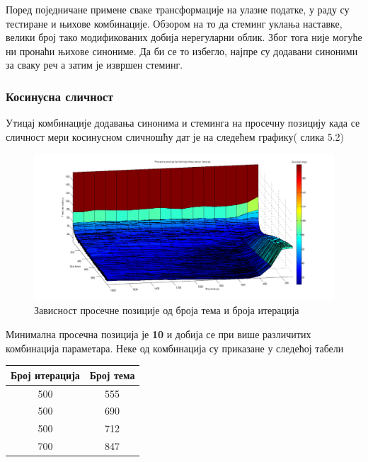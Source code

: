 Поред поједничане примене сваке трансформације на улазне податке, у раду су тестиране и њихове комбинације. Обзором на то да стеминг уклања наставке, велики број тако модификованих добија нерегуларни облик. Због тога није могуће ни пронаћи њихове синониме. Да би се то избегло, најпре су додавани синоними за сваку реч а затим је извршен стеминг.

\subsubsection{Косинусна сличност}



Утицај  комбинације додавања синонима и стеминга на просечну позицију  када се сличност мери косинусном сличношћу дат је на следећем графику( слика 5.2)

		\begin{figure}[H]
    \centering
   \includegraphics[scale=0.3]{./Slike/StemmSyn.png} 
	\caption{Зависност просечне позиције од броја тема и броја итерација}
	\label{fig:slika1}
\end{figure}

Минимална просечна позиција је \textbf{10} и добија се при више различитих комбинација параметара. Неке од комбинација су приказане у следећој табели

\begin{center}
\begin{tabular}{|c|c|}
\hline
Број итерација & Број тема \\
\hline\hline
500 & 555 \\
500 & 690 \\
500 & 712 \\
700 & 847 \\
\hline
\end{tabular}
\end{center}

